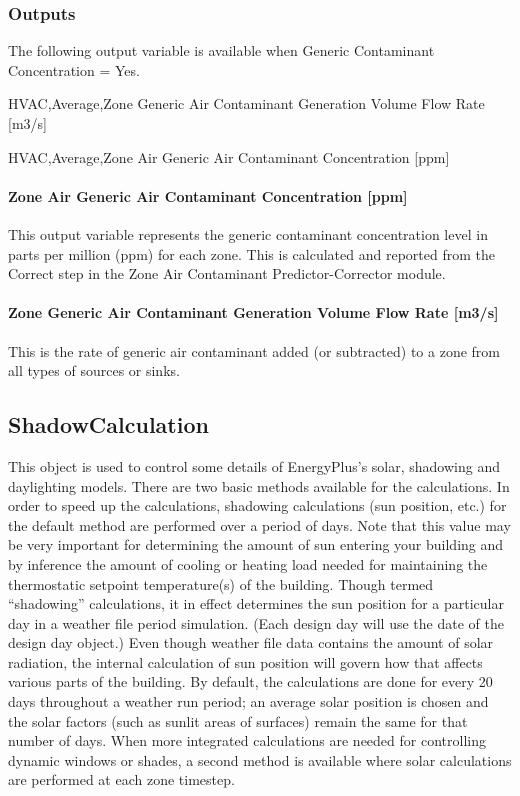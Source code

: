 \subsubsection{Outputs}\label{outputs-1-024}

The following output variable is available when Generic Contaminant Concentration = Yes.

HVAC,Average,Zone Generic Air Contaminant Generation Volume Flow Rate {[}m3/s{]}

HVAC,Average,Zone Air Generic Air Contaminant Concentration {[}ppm{]}

\paragraph{Zone Air Generic Air Contaminant Concentration {[}ppm{]}}\label{zone-air-generic-air-contaminant-concentration-ppm}

This output variable represents the generic contaminant concentration level in parts per million (ppm) for each zone. This is calculated and reported from the Correct step in the Zone Air Contaminant Predictor-Corrector module.

\paragraph{Zone Generic Air Contaminant Generation Volume Flow Rate {[}m3/s{]}}\label{zone-generic-air-contaminant-generation-volume-flow-rate-m3s}

This is the rate of generic air contaminant added (or subtracted) to a zone from all types of sources or sinks.

\subsection{ShadowCalculation}\label{shadowcalculation}

This object is used to control some details of EnergyPlus's solar, shadowing and daylighting models. There are two basic methods available for the calculations. In order to speed up the calculations, shadowing calculations (sun position, etc.) for the default method are performed over a period of days. Note that this value may be very important for determining the amount of sun entering your building and by inference the amount of cooling or heating load needed for maintaining the thermostatic setpoint temperature(s) of the building. Though termed ``shadowing'' calculations, it in effect determines the sun position for a particular day in a weather file period simulation. (Each design day will use the date of the design day object.) Even though weather file data contains the amount of solar radiation, the internal calculation of sun position will govern how that affects various parts of the building. By default, the calculations are done for every 20 days throughout a weather run period; an average solar position is chosen and the solar factors (such as sunlit areas of surfaces) remain the same for that number of days. When more integrated calculations are needed for controlling dynamic windows or shades, a second method is available where solar calculations are performed at each zone timestep.

